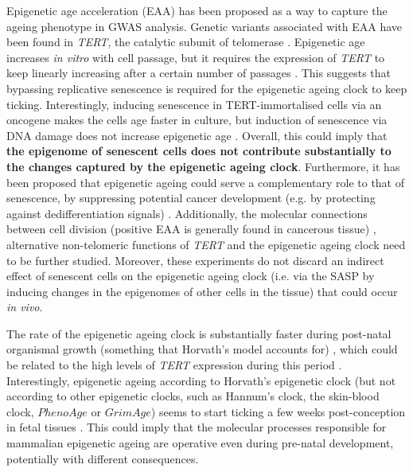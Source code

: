 Epigenetic age acceleration (\acrshort{EAA}) has been proposed as a way to capture the ageing phenotype in GWAS analysis. Genetic variants associated with \acrshort{EAA} have been found in \textit{TERT}, the catalytic subunit of telomerase \cite{Lu2018}. Epigenetic age increases \textit{in vitro} with cell passage, but it requires the expression of \textit{TERT} to keep linearly increasing after a certain number of passages \cite{Lu2018}. This suggests that bypassing replicative senescence is required for the epigenetic ageing clock to keep ticking. Interestingly, inducing senescence in TERT-immortalised cells via an oncogene makes the cells age faster in culture, but induction of senescence via DNA damage does not increase epigenetic age \cite{Lowe2016}. Overall, this could imply that \textbf{the epigenome of senescent cells does not contribute substantially to the changes captured by the epigenetic ageing clock}. Furthermore, it has been proposed that epigenetic ageing could serve a complementary role to that of senescence, by suppressing potential cancer development (e.g. by protecting against dedifferentiation signals) \cite{Horvath2018}. Additionally, the molecular connections between cell division (positive \acrshort{EAA} is generally found in cancerous tissue) \cite{Horvath2013,Hannum2013}, alternative non-telomeric functions of \textit{TERT} and the epigenetic ageing clock need to be further studied. Moreover, these experiments do not discard an indirect effect of senescent cells on the epigenetic ageing clock (i.e. via the \acrshort{SASP} by inducing changes in the epigenomes of other cells in the tissue) that could occur \textit{in vivo}. 

\bigskip

The rate of the epigenetic ageing clock is substantially faster during post-natal organismal growth (something that Horvath's model accounts for) \cite{Horvath2013}, which could be related to the high levels of \textit{TERT} expression during this period \cite{Lu2018}. Interestingly, epigenetic ageing according to Horvath's epigenetic clock (but not according to other epigenetic clocks, such as Hannum's clock, the skin-blood clock, $PhenoAge$ or $GrimAge$) seems to start ticking a few weeks post-conception in fetal tissues \cite{Hoshino2019}. This could imply that the molecular processes responsible for mammalian epigenetic ageing are operative even during pre-natal development, potentially with different consequences. 

\bigskip

